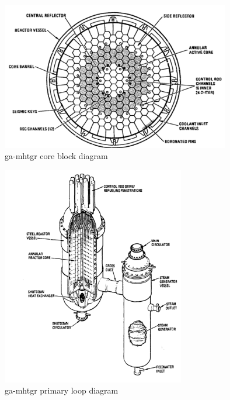 \documentclass[double,12pt]{beavtex}
\begin{document}
\begin{figure}[!ht]
    \begin{center}
    	\includegraphics[width=10cm]{Figures/GA_MHTGR_Core_Block.PNG}
    	\caption{\acrshort{ga}-\acrshort{mhtgr} core block diagram}
    	\label{fig:GA_MHTGR_Core_Block}
    	\end{center}
\end{figure}

\begin{figure}[!ht]
    \begin{center}
    	\includegraphics[width=8cm]{Figures/GA_MHTGR_System.PNG}
    	\caption{\acrshort{ga}-\acrshort{mhtgr} primary loop diagram}
    	\label{fig:GA_MHTGR_System}
    	\end{center}
\end{figure}
\end{document}
